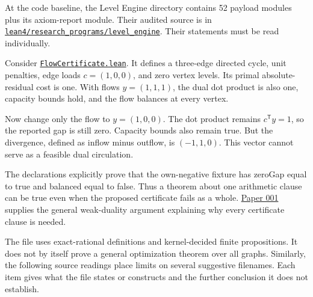 \documentclass[
  11pt,
]{article}
\begin{document}
At the code baseline, the Level Engine directory contains 52 payload
modules plus its axiom-report module. Their audited source is in
\href{https://github.com/dbccpage/the_symbol_game/blob/52cb5457f6c485ba548cfd292f6012a941ed22cf/lean4/research_programs/level_engine/README.md}{\nolinkurl{lean4/research_programs/level_engine}}.
Their statements must be read individually.

Consider
\href{https://github.com/dbccpage/the_symbol_game/blob/52cb5457f6c485ba548cfd292f6012a941ed22cf/lean4/research_programs/level_engine/FlowCertificate.lean}{\mbox{\nolinkurl{FlowCertificate.lean}}}.
It defines a three-edge directed cycle, unit penalties, edge loads
\(c=(1,0,0)\), and zero vertex levels. Its primal absolute-residual cost
is one. With flows \(y=(1,1,1)\), the dual dot product is also one,
capacity bounds hold, and the flow balances at every vertex.

Now change only the flow to \(y=(1,0,0)\). The dot product remains
\(c^\mathsf{T}y=1\), so the reported gap is still zero. Capacity bounds
also remain true. But the divergence, defined as inflow minus outflow,
is \((-1,1,0)\). This vector cannot serve as a feasible dual
circulation.

The declarations explicitly prove that the own-negative fixture has
zeroGap equal to true and balanced equal to false. Thus a theorem about
one arithmetic clause can be true even when the proposed certificate
fails as a whole.
\href{https://github.com/dbccpage/the_symbol_game/blob/23893fc44162555fa12ceda3e1665982e3d7a14e/omega_engine_atlas/coda_atlas/omega_engine_symbol_game/001_pfp_discrete_cochain_retraction_and_toy_involutions/paper.md}{Paper
001} supplies the general weak-duality argument explaining why every
certificate clause is needed.

The file uses exact-rational definitions and kernel-decided finite
propositions. It does not by itself prove a general optimization theorem
over all graphs. Similarly, the following source readings place limits
on several suggestive filenames. Each item gives what the file states or
constructs and the further conclusion it does not establish.
\end{document}
